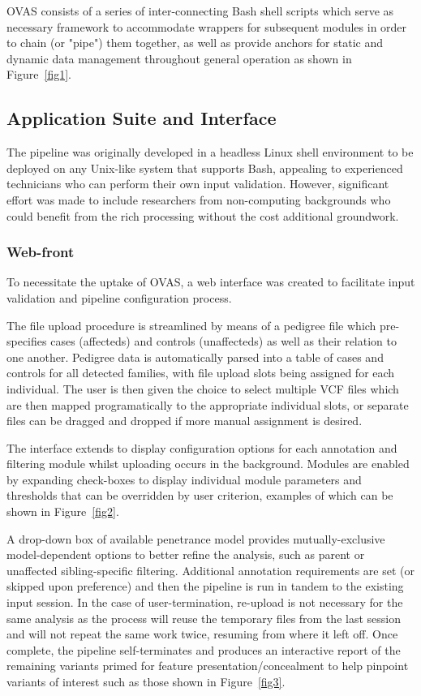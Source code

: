 \documentclass[twocolumn]{bmcart}%
\def\app{OVAS}
\begin{document}
\app{} consists of a series of inter-connecting Bash shell scripts which serve as necessary framework to accommodate wrappers for subsequent modules in order to chain (or "pipe") them together, as well as provide anchors for static and dynamic data management throughout general operation as shown in Figure~\ref{fig1}.


\subsection{Application Suite and Interface}

The pipeline was originally developed in a headless Linux shell environment to be deployed on any Unix-like system that supports Bash, appealing to experienced technicians who can perform their own input validation. However, significant effort was made to include researchers from non-computing backgrounds who could benefit from the rich processing without the cost additional groundwork.


\subsubsection{Web-front}

To necessitate the uptake of \app{}, a web interface was created to facilitate input validation and pipeline configuration process.

The file upload procedure is streamlined by means of a pedigree file which pre-specifies cases (affecteds) and controls (unaffecteds) as well as their relation to one another. Pedigree data is automatically parsed into a table of cases and controls for all detected families, with file upload slots being assigned for each individual. The user is then given the choice to select multiple VCF files which are then mapped programatically  to the appropriate individual slots, or separate files can be dragged and dropped if more manual assignment is desired.

The interface extends to display configuration options for each annotation and filtering module whilst uploading occurs in the background. Modules are enabled by expanding check-boxes to display individual module parameters and thresholds that can be overridden by user criterion, examples of which can be shown in Figure~\ref{fig2}.

A drop-down box of available penetrance model provides mutually-exclusive model-dependent options to better refine the analysis, such as parent or unaffected sibling-specific filtering. Additional annotation requirements are set (or skipped upon preference) and then the pipeline is run in tandem to the existing input session. In the case of user-termination, re-upload is not necessary for the same analysis as the process will reuse the temporary files from the last session and will not repeat the same work twice, resuming from where it left off. Once complete, the pipeline self-terminates and produces an interactive report of the remaining variants primed for feature presentation/concealment to help pinpoint variants of interest such as those shown in Figure~\ref{fig3}.
\end{document}
